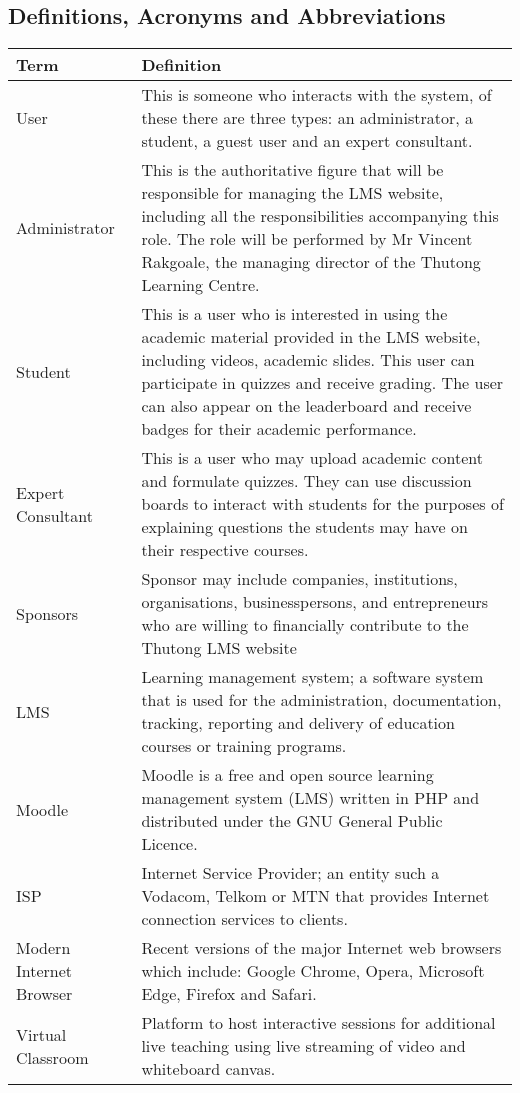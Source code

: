 \documentclass[12pt,a4paper]{article}
\begin{document}
		\subsection*{Definitions, Acronyms and Abbreviations}
			\begin{table}
				\begin{center}
					\begin{tabular}{|p{5cm}|p{10cm}|}
					\hline
					Term & Definition \\
					\hline
					User & This is someone who interacts with the system, of these there are three types: an administrator, a student, a guest user and an expert consultant. \\
					\hline
					Administrator & This is the authoritative figure that will be responsible for managing the LMS website, including all the responsibilities accompanying this role.
The role will be performed by Mr Vincent Rakgoale, the managing director of the Thutong Learning Centre.
\\ \hline
Student & This is a user who is interested in using the academic material provided in the LMS website, including videos, academic slides. This user can participate in quizzes and receive grading. The user can also appear on the leaderboard and receive badges for their academic performance.
\\ \hline
Expert Consultant & This is a user who may upload academic content and formulate quizzes. They can use discussion boards to interact with students for the  purposes of explaining questions the students may have on their respective courses.
\\ \hline
Sponsors & Sponsor may include companies, institutions, organisations, businesspersons, and entrepreneurs who are willing to financially contribute to the Thutong LMS website
\\ \hline
LMS & Learning management system; a software system that is used for the administration, documentation, tracking, reporting and delivery of education courses or training programs.
\\ \hline
Moodle & Moodle is a free and open source learning management system (LMS) written in PHP and distributed under the GNU General Public Licence.
\\ \hline
ISP & Internet Service Provider; an entity such a Vodacom, Telkom or MTN that provides Internet connection services to clients.
\\ \hline
Modern Internet Browser & Recent versions of the major Internet web browsers which include: Google Chrome, Opera, Microsoft Edge, Firefox and Safari.
\\ \hline
Virtual Classroom & Platform to host interactive sessions for additional live teaching using live streaming of video and whiteboard canvas.
\\ \hline
					\end{tabular}
				\end{center}
			\end{table}					
		
\end{document}
